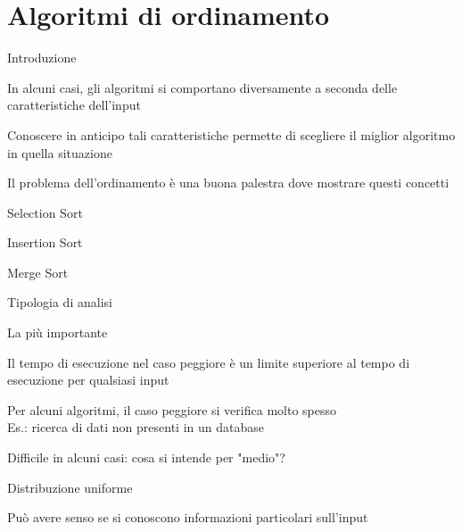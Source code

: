 \section{Algoritmi di ordinamento}

\begin{frame}{Introduzione}

\BI
\item In alcuni casi, gli algoritmi si comportano diversamente a seconda delle caratteristiche dell'input
\item Conoscere in anticipo tali caratteristiche permette di scegliere il miglior algoritmo in quella situazione
\item Il problema dell'ordinamento è una buona palestra dove mostrare questi concetti
\EI

\medskip
{}
\BI
\item Selection Sort
\item Insertion Sort
\item Merge Sort
\EI

\end{frame}



\begin{frame}{Tipologia di analisi}

\vspace{-9pt}
\begin{myboxtitle}
\BI
\item La più importante
\item Il tempo di esecuzione nel caso peggiore è un \alert{limite superiore} al tempo di esecuzione per qualsiasi input
\item Per alcuni algoritmi, il caso peggiore si verifica molto spesso\\
Es.: ricerca di dati non presenti in un database
\EI
\end{myboxtitle}
\smallskip
\begin{myboxtitle}
\BI
\item Difficile in alcuni casi: cosa si intende per "medio"?
\item Distribuzione uniforme
\EI
\end{myboxtitle}
\smallskip
\begin{myboxtitle}
\BI
\item Può avere senso se si conoscono informazioni particolari sull'input
\EI
\end{myboxtitle}
\end{frame}

